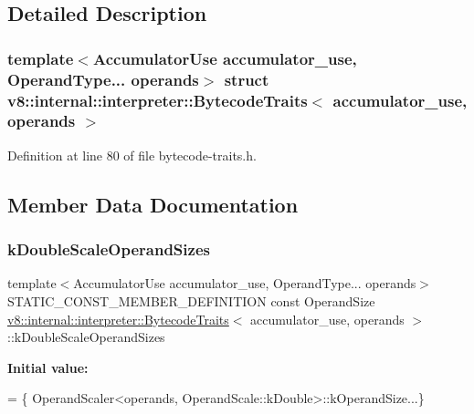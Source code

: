 \subsection{Detailed Description}
\subsubsection*{template$<$Accumulator\+Use accumulator\+\_\+use, Operand\+Type... operands$>$\newline
struct v8\+::internal\+::interpreter\+::\+Bytecode\+Traits$<$ accumulator\+\_\+use, operands $>$}



Definition at line 80 of file bytecode-\/traits.\+h.



\subsection{Member Data Documentation}
\mbox{\label{structv8_1_1internal_1_1interpreter_1_1BytecodeTraits_a24bacf0524c0269b9a58771bbeb3ae1d}} 
\subsubsection{\texorpdfstring{k\+Double\+Scale\+Operand\+Sizes}{kDoubleScaleOperandSizes}}
{\footnotesize\ttfamily template$<$Accumulator\+Use accumulator\+\_\+use, Operand\+Type... operands$>$ \\
S\+T\+A\+T\+I\+C\+\_\+\+C\+O\+N\+S\+T\+\_\+\+M\+E\+M\+B\+E\+R\+\_\+\+D\+E\+F\+I\+N\+I\+T\+I\+ON const Operand\+Size \mbox{\hyperlink{structv8_1_1internal_1_1interpreter_1_1BytecodeTraits}{v8\+::internal\+::interpreter\+::\+Bytecode\+Traits}}$<$ accumulator\+\_\+use, operands $>$\+::k\+Double\+Scale\+Operand\+Sizes\hspace{0.3cm}{\ttfamily [static]}}

{\bfseries Initial value\+:}
\begin{DoxyCode}
= \{
        OperandScaler<operands, OperandScale::kDouble>::kOperandSize...\}
\end{DoxyCode}


